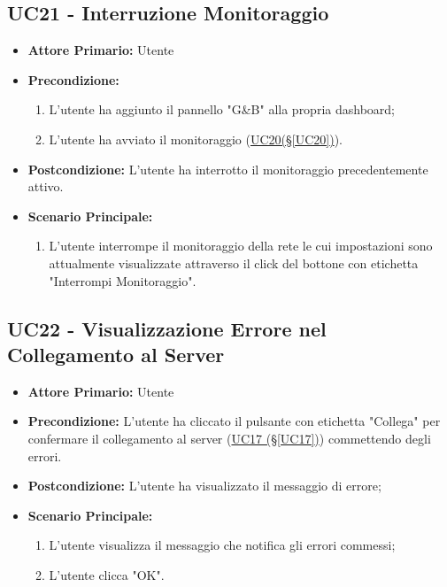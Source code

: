 \pagebreak

\subsection{UC21 - Interruzione Monitoraggio}\label{UC21}

\begin{itemize}
	\item \textbf{Attore Primario:} Utente
	\item \textbf{Precondizione:}
	\begin{enumerate}
		\item L'utente ha aggiunto il pannello "G\&B" alla propria dashboard;
		\item L'utente ha avviato il monitoraggio (\hyperref[UC20]{UC20(§\ref*{UC20})}).
	\end{enumerate}
	\item \textbf{Postcondizione:} L'utente ha interrotto il monitoraggio precedentemente attivo.
	\item \textbf{Scenario Principale:}
	\begin{enumerate}
		\item L'utente interrompe il monitoraggio della rete le cui impostazioni sono attualmente visualizzate attraverso il click del bottone con etichetta "Interrompi Monitoraggio".
	\end{enumerate}
\end{itemize}

\pagebreak

\subsection{UC22 - Visualizzazione Errore nel Collegamento al Server}\label{UC22}
\begin{itemize}
	\item \textbf{Attore Primario:}  Utente
	\item \textbf{Precondizione:} L'utente ha cliccato il pulsante con etichetta "Collega" per confermare il collegamento al server (\hyperref[UC17]{UC17 (§\ref*{UC17})}) commettendo degli errori.
	\item \textbf{Postcondizione:} L'utente ha visualizzato il messaggio di errore;
	\item \textbf{Scenario Principale:}
	\begin{enumerate}
		\item L'utente visualizza il messaggio che notifica gli errori commessi;
		\item L'utente clicca "OK".
	\end{enumerate}
\end{itemize}

